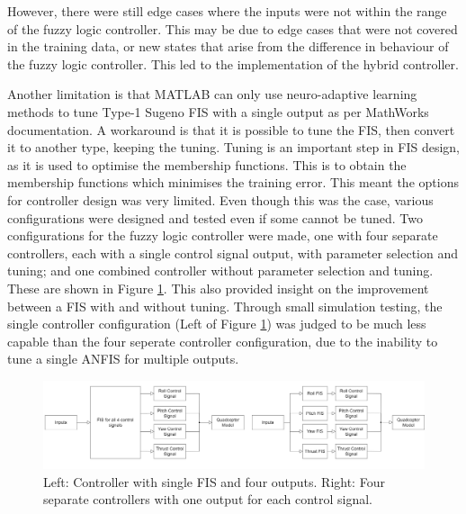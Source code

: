 However, there were still edge cases where the inputs were not within the range of the fuzzy logic controller. This may be due to edge cases that were not covered in the training data, or new states that arise from the difference in behaviour of the fuzzy logic controller. This led to the implementation of the hybrid controller.

Another limitation is that MATLAB can only use neuro-adaptive learning methods to tune Type-1 Sugeno FIS with a single output as per MathWorks documentation. A workaround is that it is possible to tune the FIS, then convert it to another type, keeping the tuning. Tuning is an important step in FIS design, as it is used to optimise the membership functions. This is to obtain the membership functions which minimises the training error. This meant the options for controller design was very limited. Even though this was the case, various configurations were designed and tested even if some cannot be tuned. Two configurations for the fuzzy logic controller were made, one with four separate controllers, each with a single control signal output, with parameter selection and tuning; and one combined controller without parameter selection and tuning. These are shown in Figure \ref{fig:fis comparison}. This also provided insight on the improvement between a FIS with and without tuning. Through small simulation testing, the single controller configuration (Left of Figure \ref{fig:fis comparison}) was judged to be much less capable than the four seperate controller configuration, due to the inability to tune a single ANFIS for multiple outputs. 
\begin{figure}[H]
    \centering
    \includegraphics[width = \textwidth]{./img/fis_comparison.png}
    \caption{Left: Controller with single FIS and four outputs. Right: Four separate controllers with one output for each control signal.}
    \label{fig:fis comparison}
\end{figure}